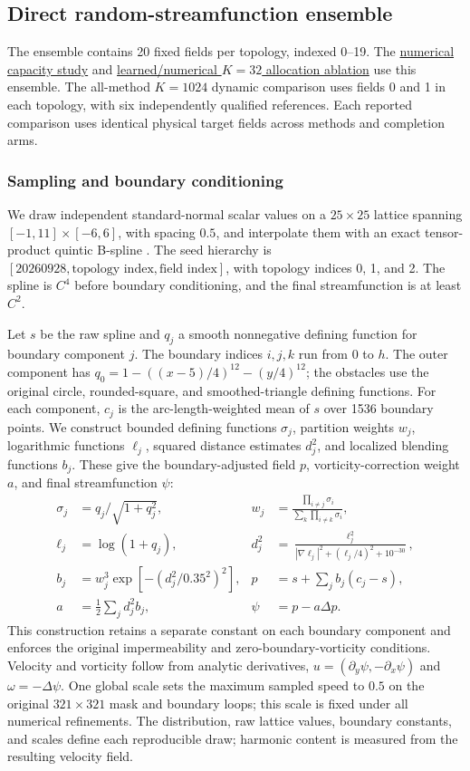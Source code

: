 \subsection{Direct random-streamfunction ensemble}
\label{app:random-streamfunction}
The ensemble contains 20 fixed fields per topology, indexed 0--19. The \hyperref[tab:random-historical-capacity]{numerical capacity study} and \hyperref[tab:random-paired]{learned/numerical $K=32$ allocation ablation} use this ensemble. The all-method $K=1024$ dynamic comparison uses fields 0 and 1 in each topology, with six independently qualified references. Each reported comparison uses identical physical target fields across methods and completion arms.

\subsubsection{Sampling and boundary conditioning}
We draw independent standard-normal scalar values on a $25\times25$ lattice spanning $[-1,11]\times[-6,6]$, with spacing $0.5$, and interpolate them with an exact tensor-product quintic B-spline {\citep{deboor1978splines}}. The seed hierarchy is $[20260928,\text{topology index},\text{field index}]$, with topology indices 0, 1, and 2. The spline is $C^4$ before boundary conditioning, and the final streamfunction is at least $C^2$.

Let $s$ be the raw spline and $q_j$ a smooth nonnegative defining function for boundary component $j$. The boundary indices $i,j,k$ run from $0$ to $h$. The outer component has $q_0=1-((x-5)/4)^{12}-(y/4)^{12}$; the obstacles use the original circle, rounded-square, and smoothed-triangle defining functions. For each component, $c_j$ is the arc-length-weighted mean of $s$ over 1536 boundary points. We construct bounded defining functions $\sigma_j$, partition weights $w_j$, logarithmic functions $\ell_j$, squared distance estimates $d_j^2$, and localized blending functions $b_j$. These give the boundary-adjusted field $p$, vorticity-correction weight $a$, and final streamfunction $\psi$:
\begin{align}
\sigma_j&=q_j/\sqrt{1+q_j^2},&
w_j&=\frac{\prod_{i\ne j}\sigma_i}{\sum_k\prod_{i\ne k}\sigma_i},\\
\ell_j&=\log(1+q_j),&
d_j^2&=\frac{\ell_j^2}{|\nabla\ell_j|^2+(\ell_j/4)^2+10^{-30}},\\
b_j&=w_j^3\exp\!\left[-\left(d_j^2/0.35^2\right)^2\right],&
p&=s+\sum_j b_j(c_j-s),\\
a&=\tfrac12\sum_j d_j^2b_j,&
\psi&=p-a\Delta p.
\end{align}
This construction retains a separate constant on each boundary component and enforces the original impermeability and zero-boundary-vorticity conditions. Velocity and vorticity follow from analytic derivatives, $u=(\partial_y\psi,-\partial_x\psi)$ and $\omega=-\Delta\psi$. One global scale sets the maximum sampled speed to $0.5$ on the original $321\times321$ mask and boundary loops; this scale is fixed under all numerical refinements. The distribution, raw lattice values, boundary constants, and scales define each reproducible draw; harmonic content is measured from the resulting velocity field.

